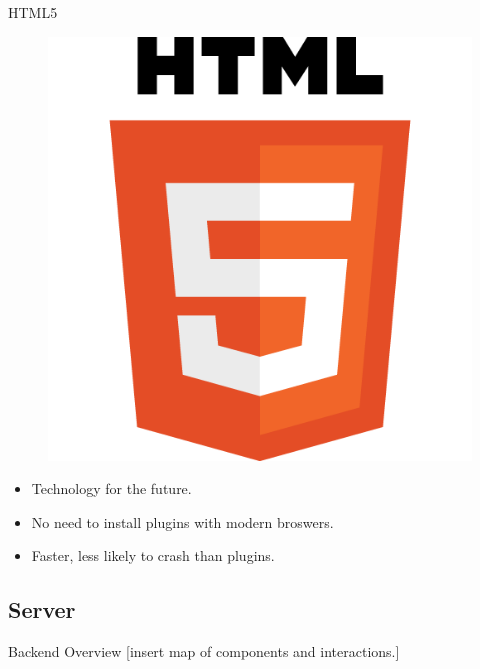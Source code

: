 \documentclass{beamer}
\begin{document}
\begin{frame}{HTML5}
  \begin{figure}[HTML5]
    \centering
    \includegraphics[scale=0.25]{HTML5_Logo_512.png}
  \end{figure}
  \begin{itemize}
    \item Technology for the future.
    \vspace{\baselineskip}
    \item No need to install plugins with modern broswers.
    \vspace{\baselineskip}
    \item Faster, less likely to crash than plugins.
  \end{itemize}
\end{frame}

\subsection{Server}

\begin{frame}{Backend Overview}
  [insert map of components and interactions.]
\end{frame}
\end{document}
